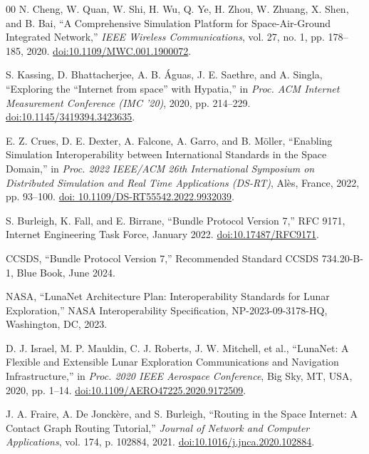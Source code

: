 \documentclass[a4paper,fleqn]{cas-sc}
\begin{document}
\begin{thebibliography}{00}
 {\color{revcolor}N. Cheng, W. Quan, W. Shi, H. Wu, Q. Ye, H. Zhou, W. Zhuang, X. Shen, and B. Bai, ``A Comprehensive Simulation Platform for Space-Air-Ground Integrated Network,'' \textit{IEEE Wireless Communications}, vol. 27, no. 1, pp. 178--185, 2020. \href{https://doi.org/10.1109/MWC.001.1900072}{doi:10.1109/MWC.001.1900072}.}

 {\color{revcolor}S. Kassing, D. Bhattacherjee, A. B. \'Aguas, J. E. Saethre, and A. Singla, ``Exploring the ``Internet from space'' with Hypatia,'' in \textit{Proc. ACM Internet Measurement Conference (IMC '20)}, 2020, pp. 214--229. \href{https://doi.org/10.1145/3419394.3423635}{doi:10.1145/3419394.3423635}.}

 {\color{revcolor}E. Z. Crues, D. E. Dexter, A. Falcone, A. Garro, and B. M\"oller, ``Enabling Simulation Interoperability between International Standards in the Space Domain,'' in \textit{Proc. 2022 IEEE/ACM 26th International Symposium on Distributed Simulation and Real Time Applications (DS-RT)}, Al\`es, France, 2022, pp. 93--100. \href{https://doi.org/10.1109/DS-RT55542.2022.9932039}{doi: 10.1109/DS-RT55542.2022.9932039}.}

 {\color{revcolor}S. Burleigh, K. Fall, and E. Birrane, ``Bundle Protocol Version 7,'' RFC 9171, Internet Engineering Task Force, January 2022. \href{https://doi.org/10.17487/RFC9171}{doi:10.17487/RFC9171}.}

 {\color{revcolor}CCSDS, ``Bundle Protocol Version 7,'' Recommended Standard CCSDS 734.20-B-1, Blue Book, June 2024.}

 {\color{revcolor}NASA, ``LunaNet Architecture Plan: Interoperability Standards for Lunar Exploration,'' NASA Interoperability Specification, NP-2023-09-3178-HQ, Washington, DC, 2023.}

 {\color{revcolor}D. J. Israel, M. P. Mauldin, C. J. Roberts, J. W. Mitchell, et al., ``LunaNet: A Flexible and Extensible Lunar Exploration Communications and Navigation Infrastructure,'' in \textit{Proc. 2020 IEEE Aerospace Conference}, Big Sky, MT, USA, 2020, pp. 1--14. \href{https://doi.org/10.1109/AERO47225.2020.9172509}{doi:10.1109/AERO47225.2020.9172509}.}

 {\color{revcolor}J. A. Fraire, A. De Jonck\`ere, and S. Burleigh, ``Routing in the Space Internet: A Contact Graph Routing Tutorial,'' \textit{Journal of Network and Computer Applications}, vol. 174, p. 102884, 2021. \href{https://doi.org/10.1016/j.jnca.2020.102884}{doi:10.1016/j.jnca.2020.102884}.}


\end{thebibliography}
\end{document}
